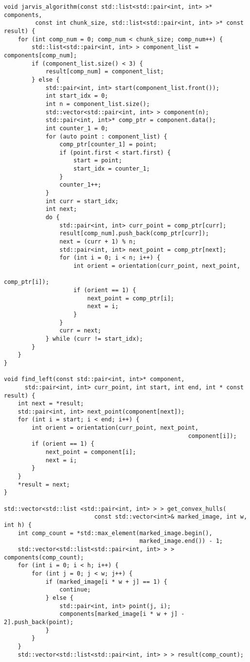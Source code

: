 \documentclass{report}
\begin{document}
\begin{lstlisting}
void jarvis_algorithm(const std::list<std::pair<int, int> >* components,
         const int chunk_size, std::list<std::pair<int, int> >* const result) {
    for (int comp_num = 0; comp_num < chunk_size; comp_num++) {
        std::list<std::pair<int, int> > component_list = components[comp_num];
        if (component_list.size() < 3) {
            result[comp_num] = component_list;
        } else {
            std::pair<int, int> start(component_list.front());
            int start_idx = 0;
            int n = component_list.size();
            std::vector<std::pair<int, int> > component(n);
            std::pair<int, int>* comp_ptr = component.data();
            int counter_1 = 0;
            for (auto point : component_list) {
                comp_ptr[counter_1] = point;
                if (point.first < start.first) {
                    start = point;
                    start_idx = counter_1;
                }
                counter_1++;
            }
            int curr = start_idx;
            int next;
            do {
                std::pair<int, int> curr_point = comp_ptr[curr];
                result[comp_num].push_back(comp_ptr[curr]);
                next = (curr + 1) % n;
                std::pair<int, int> next_point = comp_ptr[next];
                for (int i = 0; i < n; i++) {
                    int orient = orientation(curr_point, next_point,
                                                                 comp_ptr[i]);
                    if (orient == 1) {
                        next_point = comp_ptr[i];
                        next = i;
                    }
                }
                curr = next;
            } while (curr != start_idx);
        }
    }
}

void find_left(const std::pair<int, int>* component,
      std::pair<int, int> curr_point, int start, int end, int * const result) {
    int next = *result;
    std::pair<int, int> next_point(component[next]);
    for (int i = start; i < end; i++) {
        int orient = orientation(curr_point, next_point,
                                                     component[i]);
        if (orient == 1) {
            next_point = component[i];
            next = i;
        }
    }
    *result = next;
}

std::vector<std::list <std::pair<int, int> > > get_convex_hulls(
                          const std::vector<int>& marked_image, int w, int h) {
    int comp_count = *std::max_element(marked_image.begin(),
                                       marked_image.end()) - 1;
    std::vector<std::list<std::pair<int, int> > > components(comp_count);
    for (int i = 0; i < h; i++) {
        for (int j = 0; j < w; j++) {
            if (marked_image[i * w + j] == 1) {
                continue;
            } else {
                std::pair<int, int> point(j, i);
                components[marked_image[i * w + j] - 2].push_back(point);
            }
        }
    }
    std::vector<std::list<std::pair<int, int> > > result(comp_count);


\end{lstlisting}
\end{document}
